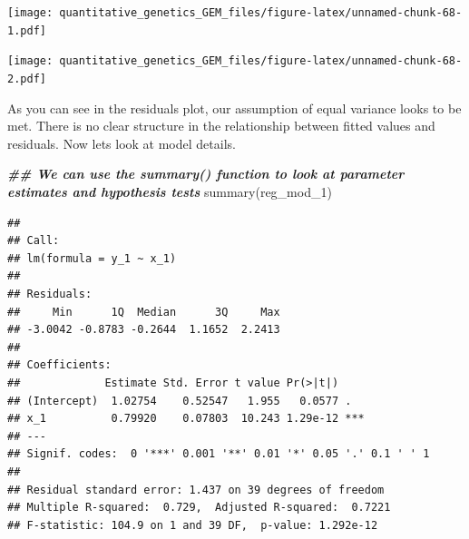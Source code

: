 \documentclass[
]{book}
\newenvironment{Shaded}{\begin{snugshade}}{\end{snugshade}}
\newcommand{\AttributeTok}[1]{\textcolor[rgb]{0.77,0.63,0.00}{#1}}
\newcommand{\DocumentationTok}[1]{\textcolor[rgb]{0.56,0.35,0.01}{\textbf{\textit{#1}}}}
\newcommand{\FunctionTok}[1]{\textcolor[rgb]{0.00,0.00,0.00}{#1}}
\newcommand{\NormalTok}[1]{#1}
\newcommand{\OtherTok}[1]{\textcolor[rgb]{0.56,0.35,0.01}{#1}}
\newcommand{\SpecialCharTok}[1]{\textcolor[rgb]{0.00,0.00,0.00}{#1}}
\newcommand{\StringTok}[1]{\textcolor[rgb]{0.31,0.60,0.02}{#1}}
\begin{document}
\texttt{[image: quantitative\_genetics\_GEM\_files/figure-latex/unnamed-chunk-68-1.pdf]}

\begin{Shaded}
\end{Shaded}

\texttt{[image: quantitative\_genetics\_GEM\_files/figure-latex/unnamed-chunk-68-2.pdf]}

As you can see in the residuals plot, our assumption of equal variance looks to be met. There is no clear structure in the relationship between fitted values and residuals. Now lets look at model details.

\begin{Shaded}
\begin{Highlighting}[]
\DocumentationTok{\#\# We can use the summary() function to look at parameter estimates and hypothesis tests}
\FunctionTok{summary}\NormalTok{(reg\_mod\_1)}
\end{Highlighting}
\end{Shaded}

\begin{verbatim}
## 
## Call:
## lm(formula = y_1 ~ x_1)
## 
## Residuals:
##     Min      1Q  Median      3Q     Max 
## -3.0042 -0.8783 -0.2644  1.1652  2.2413 
## 
## Coefficients:
##             Estimate Std. Error t value Pr(>|t|)    
## (Intercept)  1.02754    0.52547   1.955   0.0577 .  
## x_1          0.79920    0.07803  10.243 1.29e-12 ***
## ---
## Signif. codes:  0 '***' 0.001 '**' 0.01 '*' 0.05 '.' 0.1 ' ' 1
## 
## Residual standard error: 1.437 on 39 degrees of freedom
## Multiple R-squared:  0.729,  Adjusted R-squared:  0.7221 
## F-statistic: 104.9 on 1 and 39 DF,  p-value: 1.292e-12
\end{verbatim}
\end{document}
